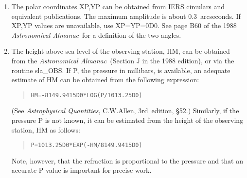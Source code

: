 {\begin{enumerate}
        longitude required by the present routine is {\bf east-positive},
        in accordance with geographical convention (and right-handed).
        In particular, note that the longitudes returned by the
        sla\_OBS routine are west-positive, following astronomical
        usage, and must be reversed in sign before use in the present
        routine.
  \item The polar coordinates XP,YP can be obtained from IERS
        circulars and equivalent publications.  The
        maximum amplitude is about 0.3~arcseconds.  If XP,YP values
        are unavailable, use XP=YP=0D0.  See page B60 of the 1988
        {\it Astronomical Almanac}\, for a definition of the two angles.
  \item The height above sea level of the observing station, HM,
        can be obtained from the {\it Astronomical Almanac}\, (Section J
        in the 1988 edition), or via the routine sla\_OBS.  If P,
        the pressure in millibars, is available, an adequate
        estimate of HM can be obtained from the following expression:
        \begin{quote}
         \verb|HM=-8149.9415D0*LOG(P/1013.25D0)|
        \end{quote}
        (See {\it Astrophysical Quantities}, C.W.Allen, 3rd~edition,
        \S52.)  Similarly, if the pressure P is not known,
        it can be estimated from the height of the observing
        station, HM as follows:
        \begin{quote}
         \verb|P=1013.25D0*EXP(-HM/8149.9415D0)|
        \end{quote}
        Note, however, that the refraction is proportional to the
        pressure and that an accurate P value is important for
        precise work.
 \end{enumerate}
}
{
}

